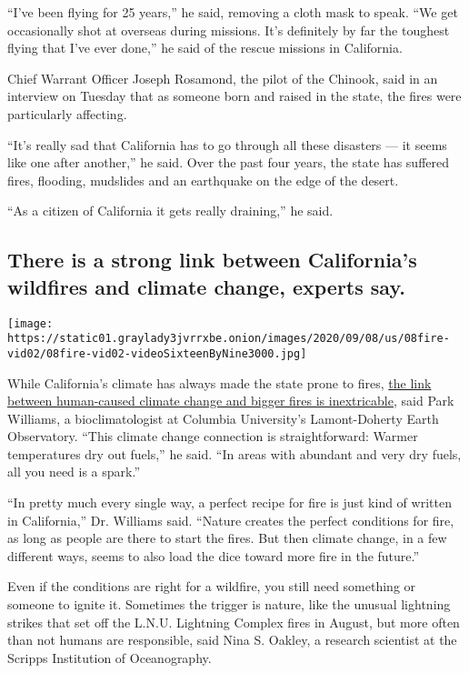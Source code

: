 ``I've been flying for 25 years,'' he said, removing a cloth mask to
speak. ``We get occasionally shot at overseas during missions. It's
definitely by far the toughest flying that I've ever done,'' he said of
the rescue missions in California.

Chief Warrant Officer Joseph Rosamond, the pilot of the Chinook, said in
an interview on Tuesday that as someone born and raised in the state,
the fires were particularly affecting.

``It's really sad that California has to go through all these disasters
--- it seems like one after another,'' he said. Over the past four
years, the state has suffered fires, flooding, mudslides and an
earthquake on the edge of the desert.

``As a citizen of California it gets really draining,'' he said.

\hypertarget{there-is-a-strong-link-between-californias-wildfires-and-climate-change-experts-say}{%
\subsection{There is a strong link between California's wildfires and
climate change, experts
say.}\label{there-is-a-strong-link-between-californias-wildfires-and-climate-change-experts-say}}

\texttt{[image: https://static01.graylady3jvrrxbe.onion/images/2020/09/08/us/08fire-vid02/08fire-vid02-videoSixteenByNine3000.jpg]}

While California's climate has always made the state prone to fires,
\href{https://agupubs.onlinelibrary.wiley.com/doi/full/10.1029/2019EF001210}{the
link between human-caused climate change and bigger fires is
inextricable}, said Park Williams, a bioclimatologist at Columbia
University's Lamont-Doherty Earth Observatory. ``This climate change
connection is straightforward: Warmer temperatures dry out fuels,'' he
said. ``In areas with abundant and very dry fuels, all you need is a
spark.''

``In pretty much every single way, a perfect recipe for fire is just
kind of written in California,'' Dr. Williams said. ``Nature creates the
perfect conditions for fire, as long as people are there to start the
fires. But then climate change, in a few different ways, seems to also
load the dice toward more fire in the future.''

Even if the conditions are right for a wildfire, you still need
something or someone to ignite it. Sometimes the trigger is nature, like
the unusual lightning strikes that set off the L.N.U. Lightning Complex
fires in August, but more often than not humans are responsible, said
Nina S. Oakley, a research scientist at the Scripps Institution of
Oceanography.

